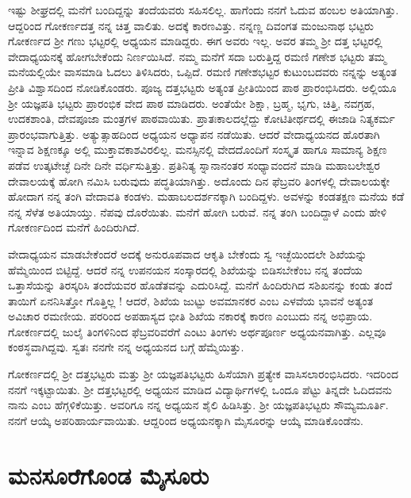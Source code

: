 {ಇಷ್ಟು ಶೀಘ್ರದಲ್ಲಿ ಮನೆಗೆ ಬಂದಿದ್ದನ್ನು ತಂದೆಯವರು ಸಹಿಸಲಿಲ್ಲ. ಹಾಗೆಂದು ನನಗೆ ಓದುವ ಹಂಬಲ ಅತಿಯಾಗಿತ್ತು.  ಆದ್ದರಿಂದ ಗೋಕರ್ಣದತ್ತ ನನ್ನ ಚಿತ್ತ ವಾಲಿತು.  ಅದಕ್ಕೆ ಕಾರಣವಿತ್ತು.  ನನ್ನಣ್ಣ ದಿವಂಗತ ಮಂಜುನಾಥ ಭಟ್ಟರು ಗೋಕರ್ಣದ ಶ್ರೀ ಗಣು ಭಟ್ಟರಲ್ಲಿ ಅಧ್ಯಯನ ಮಾಡಿದ್ದರು. ಈಗ ಅವರು ಇಲ್ಲ.  ಅವರ ತಮ್ಮ ಶ್ರೀ ದತ್ತ ಭಟ್ಟರಲ್ಲಿ ವೇದಾಧ್ಯಯನಕ್ಕೆ ಹೋಗಬೇಕೆಂದು ನಿರ್ಣಯಿಸಿದೆ.  ನಮ್ಮ ಮನೆಗೆ ಸದಾ ಬರುತ್ತಿದ್ದ ರಮಣಿ ಗಣೇಶ ಭಟ್ಟರು ತಮ್ಮ ಮನೆಯಲ್ಲಿಯೇ ವಾಸಮಾಡಿ ಓದಲು ತಿಳಿಸಿದರು,  ಒಪ್ಪಿದೆ.  ರಮಣಿ ಗಣೇಶಭಟ್ಟರ ಕುಟುಂಬದವರು ನನ್ನನ್ನು ಅತ್ಯಂತ ಪ್ರೀತಿ ವಿಶ್ವಾಸದಿಂದ ನೋಡಿಕೊಂಡರು.  ಪೂಜ್ಯ ದತ್ತಭಟ್ಟರು ಅತ್ಯಂತ ಪ್ರೀತಿಯಿಂದ ಪಾಠ ಪ್ರಾರಂಭಿ\-ಸಿದರು.  ಅಲ್ಲಿಯೂ ಶ್ರೀ ಯಜ್ಞಪತಿ ಭಟ್ಟರು ಪ್ರಾರಂಭಿಕ ವೇದ ಪಾಠ ಮಾಡಿದರು.  ಅಂತೆಯೇ ಶಿಕ್ಷಾ, ಬ್ರಹ್ಮ, ಭೃಗು, ಚಿತ್ತಿ, ನವಗ್ರಹ, ಉದಕಶಾಂತಿ, ದೇವಪೂಜಾ ಮಂತ್ರಗಳ ಪಾಠ\-ವಾಯಿತು.  ಪ್ರಾತಃಕಾಲದಲ್ಲೆದ್ದು ಕೋಟಿತೀರ್ಥದಲ್ಲಿ ಈಜಾಡಿ ನಿತ್ಯಕರ್ಮ ಪ್ರಾರಂಭವಾಗುತ್ತಿತ್ತು.  ಅತ್ಯುತ್ಸಾಹದಿಂದ ಅಧ್ಯಯನ  \enginline{-}  ಅಧ್ಯಾಪನ ನಡೆಯಿತು.  ಆದರೆ ವೇದಾಧ್ಯಯನದ ಹೊರತಾಗಿ ಇನ್ನಾವ ಶಿಕ್ಷಣಕ್ಕೂ ಅಲ್ಲಿ ಮುಕ್ತಾವಕಾಶವಿರಲಿಲ್ಲ.  ಮನಸ್ಸಿ\-ನಲ್ಲಿ ವೇದದೊಂದಿಗೆ ಸಂಸ್ಕೃತ ಹಾಗೂ ಸಾಮಾನ್ಯ ಶಿಕ್ಷಣ ಪಡೆವ ಉತ್ಕಟೇಚ್ಛೆ ದಿನೇ ದಿನೇ ವರ್ಧಿಸುತ್ತಿತ್ತು.  ಪ್ರತಿನಿತ್ಯ ಸ್ನಾನಾನಂತರ ಸಂಧ್ಯಾವಂದನೆ ಮಾಡಿ ಮಹಾಬಲೇಶ್ವರ ದೇವಾಲಯಕ್ಕೆ ಹೋಗಿ ನಮಿಸಿ ಬರುವುದು ಪದ್ಧತಿಯಾಗಿತ್ತು.  ಅದೊಂದು ದಿನ ಫೆಬ್ರವರಿ ತಿಂಗಳಲ್ಲಿ ದೇವಾಲಯಕ್ಕೇ ಹೋದಾಗ ನನ್ನ ತಂಗಿ ವೇದಾವತಿ ಕಂಡಳು.  ಮಹಾಬಲದರ್ಶನಕ್ಕಾಗಿ ಬಂದಿದ್ದಳು.  ಅವಳನ್ನು ಕಂಡತಕ್ಷಣ ಮನೆಯ ಕಡೆ ನನ್ನ ಸೆಳೆತ ಅತಿಯಾಯ್ತು.  ನೆಪವು ದೊರೆಯಿತು.  ಮನೆಗೆ ಹೋಗಿ ಬರುವೆ. ನನ್ನ ತಂಗಿ ಬಂದಿದ್ದಾಳೆ ಎಂದು ಹೇಳಿ ಗೋಕರ್ಣದಿಂದ ಮನೆಗೆ ಹಿಂದಿರುಗಿದೆ.  

ವೇದಾಧ್ಯಯನ ಮಾಡಬೇಕೆಂದರೆ ಅದಕ್ಕೆ ಅನುರೂಪವಾದ ಆಕೃತಿ ಬೇಕೆಂದು ಸ್ವ ಇಚ್ಛೆಯಿಂದಲೇ ಶಿಖೆಯನ್ನು ಹೆಮ್ಮೆಯಿಂದ ಬಿಟ್ಟಿದ್ದೆ.  ಆದರೆ ನನ್ನ ಉಪನಯನ ಸಂಸ್ಕಾರ\-ದಲ್ಲಿ ಶಿಖೆಯನ್ನು ಬಿಡಿಸಬೇಕೆಂಬ ನನ್ನ ತಂದೆಯ ಒತ್ತಾಸೆಯನ್ನು ತಿರಸ್ಕರಿಸಿ ತಂದೆಯವರ ಹೊಡೆತವನ್ನು ಎದುರಿಸಿದ್ದೆ.  ಮನೆಗೆ ಹಿಂದಿರುಗಿದ ಸಶಿಖನನ್ನು ಕಂಡು ತಂದೆ \enginline{-}ತಾಯಿಗೆ ಏನನಿಸಿತ್ತೋ ಗೊತ್ತಿಲ್ಲ !  ಆದರೆ, ಶಿಖೆಯ ಜುಟ್ಟು ಅವಮಾನಕರ ಎಂಬ ಎಳವೆಯ ಭಾವನೆ ಅತ್ಯಂತ ಅವಿಚಾರ ರಮಣೀಯ. ಪರರಿಂದ ಅಪಹಾಸ್ಯದ ಭೀತಿ ಶಿಖೆಯ ನಕಾರಕ್ಕೆ ಕಾರಣ ಎಂಬುದು ನನ್ನ ಅಭಿಪ್ರಾಯ.  ಗೋಕರ್ಣದಲ್ಲಿ ಜುಲೈ ತಿಂಗಳಿನಿಂದ ಫೆಬ್ರವರಿವರೆಗೆ ಎಂಟು ತಿಂಗಳು ಅರ್ಥಪೂರ್ಣ ಅಧ್ಯಯನವಾಗಿತ್ತು.  ಎಲ್ಲವೂ ಕಂಠಸ್ಥ\-ವಾಗಿದ್ದವು.  ಸ್ವತಃ ನನಗೇ ನನ್ನ ಅಧ್ಯಯನದ ಬಗ್ಗೆ ಹೆಮ್ಮೆಯಿತ್ತು.

ಗೋಕರ್ಣದಲ್ಲಿ ಶ್ರೀ ದತ್ತಭಟ್ಟರು ಮತ್ತು ಶ್ರೀ ಯಜ್ಞಪತಿಭಟ್ಟರು ಹಿಸೆಯಾಗಿ ಪ್ರತ್ಯೇಕ ವಾಸಿಸಲಾರಂಭಿಸಿದರು.  ಇದರಿಂದ ನನಗೆ ಇಕ್ಕಟ್ಟಾಯಿತು. ಶ್ರೀ ದತ್ತಭಟ್ಟರಲ್ಲಿ ಅಧ್ಯಯನ ಮಾಡಿದ ವಿದ್ಯಾರ್ಥಿಗಳಲ್ಲಿ ಒಂದೂ ಪೆಟ್ಟು ತಿನ್ನದೇ ಓದಿದವನು ನಾನು ಎಂಬ ಹೆಗ್ಗಳಿಕೆಯಿತ್ತು.  ಅವರಿಗೂ ನನ್ನ ಅಧ್ಯಯನ ಶೈಲಿ ಹಿಡಿಸಿತ್ತು.  ಶ್ರೀ ಯಜ್ಞಪತಿಭಟ್ಟರು ಸೌಮ್ಯಮೂರ್ತಿ. ನನಗೆ ಆಯ್ಕೆ ಅಪರಿಹಾರ್ಯವಾಯಿತು.  ಆದ್ದರಿಂದ ಅಧ್ಯಯನ\-ಕ್ಕಾಗಿ ಮೈಸೂರನ್ನು ಆಯ್ಕೆ ಮಾಡಿಕೊಂಡೆನು.

\section*{ಮನಸೂರೆಗೊಂಡ ಮೈಸೂರು}

}
